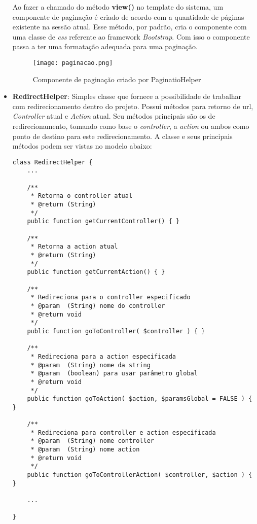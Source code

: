 \begin{itemize}
            Ao fazer a chamado do método \textbf{view()} no template do sistema, um componente de paginação é criado de acordo com a quantidade de páginas existente na sessão atual. Esse método, por padrão, cria o componente com uma classe de \emph{css} referente ao framework \emph{Bootstrap}. Com isso o componente passa a ter uma formatação adequada para uma paginação.

            \begin{figure}[!htb]
                \centering
                \texttt{[image: paginacao.png]}
                \caption{\small Componente de paginação criado por PaginatioHelper}
                \label{cap:paginaca}
            \end{figure}


            \item\textbf{RedirectHelper}: Simples classe que fornece a possibilidade de trabalhar com redirecionamento dentro do projeto. Possui métodos para retorno de url, \emph{Controller} atual e \emph{Action} atual. Seu métodos principais são os de redirecionamento, tomando como base o \emph{controller}, a \emph{action} ou ambos como ponto de destino para este redirecionamento. A classe e seus principais métodos podem ser vistas no modelo abaixo:


\begin{lstlisting}
class RedirectHelper {
    ...

    /**
     * Retorna o controller atual
     * @return (String)
     */
    public function getCurrentController() { }

    /**
     * Retorna a action atual
     * @return (String)
     */
    public function getCurrentAction() { }

    /**
     * Redireciona para o controller especificado
     * @param  (String) nome do controller
     * @return void
     */
    public function goToController( $controller ) { }

    /**
     * Redireciona para a action especificada
     * @param  (String) nome da string
     * @param  (boolean) para usar parâmetro global
     * @return void
     */
    public function goToAction( $action, $paramsGlobal = FALSE ) { }

    /**
     * Redireciona para controller e action especificada
     * @param  (String) nome controller
     * @param  (String) nome action
     * @return void
     */
    public function goToControllerAction( $controller, $action ) { }

    ...

}
\end{lstlisting}

            \end{itemize}




